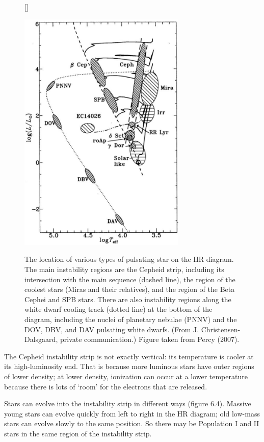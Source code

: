 \documentclass[a4paper,10pt]{article}
\begin{document}
\begin{figure}[t]
    [\FBwidth]
    {\caption{\footnotesize{The location of various types of pulsating star on the HR diagram. The main instability regions are the Cepheid strip, including its intersection with the main sequence (dashed line), the region of the coolest stars (Miras and their relatives), and the region of the Beta Cephei and SPB stars. There are also instability regions along the white dwarf cooling track (dotted line) at the bottom of the diagram, including the nuclei of planetary nebulae (PNNV) and the DOV, DBV, and DAV pulsating white dwarfs. (From J. Christensen-Dalsgaard, private communication.) Figure taken from Percy (2007).}}
    \label{fig:hrpulsating}}
    {\includegraphics[width=8cm]{figures/HR_pulsating.png}}
\end{figure}

{\noindent}The Cepheid instability strip is not exactly vertical: its temperature is cooler at its high-luminosity end. That is because more luminous stars have outer regions of lower density; at lower density, ionization can occur at a lower temperature because there is lots of `room' for the electrons that are released.

{\noindent}Stars can evolve into the instability strip in different ways (figure 6.4). Massive young stars can evolve quickly from left to right in the HR diagram; old low-mass stars can evolve slowly to the same position. So there may be Population I and II stars in the same region of the instability strip.
\end{document}
